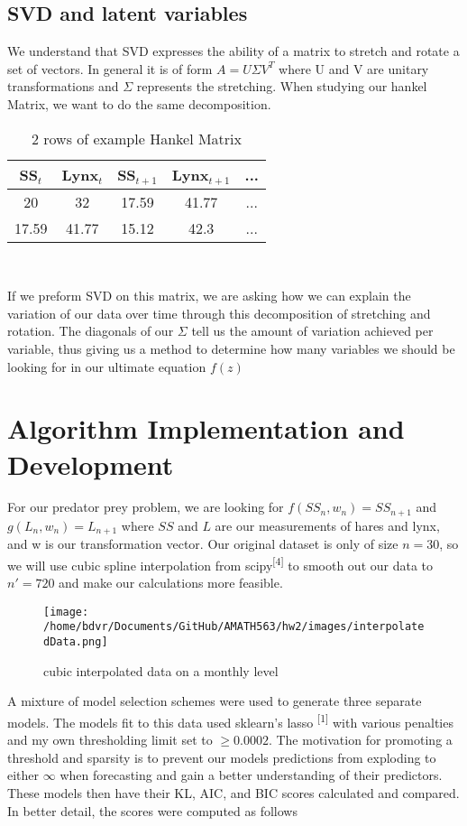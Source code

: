 \documentclass[12pt]{article}
\begin{document}
	\subsection{SVD and latent variables}
	We understand that SVD expresses the ability of a matrix to stretch and rotate a set of vectors. In general it is of form $A = U\Sigma V^T$ where U and V are unitary transformations and $\Sigma$ represents the stretching. When studying our hankel Matrix, we want to do the same decomposition. 
	\begin{wraptable}{r}{5.5cm}
		\caption{2 rows of example Hankel Matrix}
			\begin{tabular}{ccccc}
			\toprule
			SS$_t$ & Lynx$_t$ & SS$_{t+1}$ & Lynx$_{t+1}$ &...\\
			\midrule
			20&32&17.59&41.77&...\\
			17.59&41.77&15.12&42.3&...
		\end{tabular}\\
	\end{wraptable}
If we preform SVD on this matrix, we are asking how we can explain the variation of our data over time through this decomposition of stretching and rotation. The diagonals of our $\Sigma$ tell us the amount of variation achieved per variable, thus giving us a method to determine how many variables we should be looking for in our ultimate equation $f(z)$
	
\section{Algorithm Implementation and Development}
For our predator prey problem, we are looking for $f(SS_n,w_n) = SS_{n+1}$ and $g(L_n,w_n)=L_{n+1}$ where $SS$ and $L$ are our measurements of hares and lynx, and w is our transformation vector. Our original dataset is only of size $n=30$, so we will use cubic spline interpolation from scipy\textsuperscript{[4]} to smooth out our data to $n'=720$ and make our calculations more feasible. 
\begin{wrapfigure}[11]{l}{3.25in}
	\texttt{[image: /home/bdvr/Documents/GitHub/AMATH563/hw2/images/interpolatedData.png]}
	\caption{cubic interpolated data on a monthly level}
\end{wrapfigure}
A mixture of model selection schemes were used to generate three separate models. The models fit to this data used sklearn's lasso \textsuperscript{[1]} with various penalties and my own thresholding limit set to $\ge 0.0002$. The motivation for promoting a threshold and sparsity is to prevent our models predictions from exploding to either $\infty$ when forecasting and gain a better understanding of their predictors. These models then have their KL, AIC, and BIC scores calculated and compared. In better detail, the scores were computed as follows 
\end{document}
